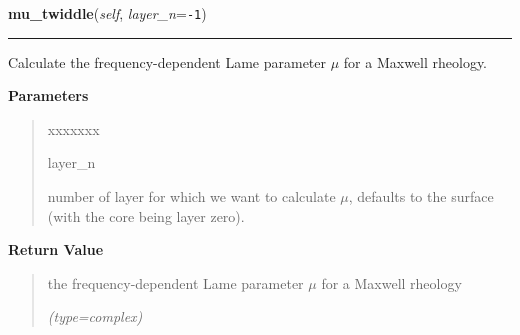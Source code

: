 \hspace{.8\funcindent}\begin{boxedminipage}{\funcwidth}

    \raggedright \textbf{mu\_twiddle}(\textit{self}, \textit{layer\_n}={\tt -1})

    \vspace{-1.5ex}

    \rule{\textwidth}{0.5\fboxrule}
\setlength{\parskip}{2ex}
    Calculate the frequency-dependent Lame parameter \(\mu\) for a Maxwell 
    rheology.

\setlength{\parskip}{1ex}
      \textbf{Parameters}
      \vspace{-1ex}

      \begin{quote}
        \begin{Ventry}{xxxxxxx}

          \item[layer\_n]

          number of layer for which we want to calculate \(\mu\), defaults 
          to the surface (with the core being layer zero).

        \end{Ventry}

      \end{quote}

      \textbf{Return Value}
    \vspace{-1ex}

      \begin{quote}
      the frequency-dependent Lame parameter \(\mu\) for a Maxwell rheology

      {\it (type=complex)}

      \end{quote}

    \end{boxedminipage}

    \label{SatStress:SatStress:StressDef:lambda_twiddle}

    \vspace{0.5ex}

